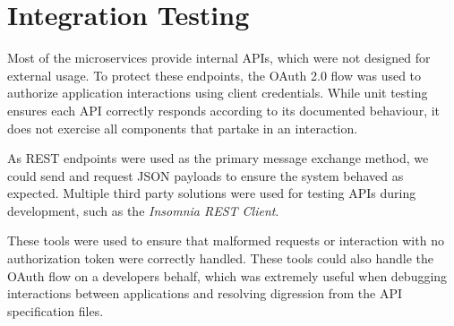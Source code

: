 \section{Integration Testing}
\par
Most of the microservices provide internal APIs, which were not designed for external usage. To protect these endpoints, the OAuth 2.0 flow was used to authorize application interactions using client credentials. While unit testing ensures each API correctly responds according to its documented behaviour, it does not exercise all components that partake in an interaction.

\par
As REST endpoints were used as the primary message exchange method, we could send and request JSON payloads to ensure the system behaved as expected. Multiple third party solutions were used for testing APIs during development, such as the \textit{Insomnia REST Client}\cite{insomnia}.

\par
These tools were used to ensure that malformed requests or interaction with no authorization token were correctly handled. These tools could also handle the OAuth flow on a developers behalf, which was extremely useful when debugging interactions between applications and resolving digression from the API specification files.
